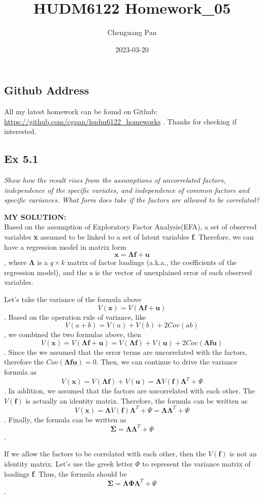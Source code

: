 \documentclass[
]{article}
\title{HUDM6122 Homework\_05}
\author{Chenguang Pan}
\date{2023-03-20}
\begin{document}
\maketitle

\hypertarget{github-address}{%
\subsection{Github Address}\label{github-address}}

All my latest homework can be found on Github:
\url{https://github.com/cgpan/hudm6122_homeworks} . Thanks for checking
if interested.

\hypertarget{ex-5.1}{%
\subsection{Ex 5.1}\label{ex-5.1}}

\emph{Show how the result rises from the assumptions of uncorrelated
factors, independence of the specific variates, and independence of
common factors and specific variances. What form does take if the
factors are allowed to be correlated?}

\textbf{MY SOLUTION:}\\
Based on the assumption of Exploratory Factor Analysis(EFA), a set of
observed variables \textbf{x} assumed to be linked to a set of latent
variables \textbf{f}. Therefore, we can have a regression model in
matrix form
\[\boldsymbol x=\boldsymbol\Lambda \boldsymbol f + \boldsymbol u\],
where \(\boldsymbol \Lambda\) is a \(q \times k\) matrix of factor
loadings (a.k.a., the coefficients of the regression model), and the
\emph{u} is the vector of unexplained error of each observed variables.

Let's take the variance of the formula above
\[V(\boldsymbol x) = V(\boldsymbol\Lambda \boldsymbol f + \boldsymbol u)\].
Based on the operation rule of variance, like
\[V(a+b)= V(a) + V(b) + 2Cov(ab)\], we combined the two formulas above,
then
\[V(\boldsymbol x) = V(\boldsymbol\Lambda \boldsymbol f + \boldsymbol u) = V(\boldsymbol\Lambda \boldsymbol f) + V(\boldsymbol u) + 2 Cov(\boldsymbol\Lambda \boldsymbol f \boldsymbol u)\].
Since the we assumed that the error terms are uncorrelated with the
factors, therefore the
\(Cov(\boldsymbol\Lambda \boldsymbol f \boldsymbol u)=0\). Then, we can
continue to drive the variance formula as
\[V(\boldsymbol x) = V(\boldsymbol\Lambda \boldsymbol f) + V(\boldsymbol u) = \boldsymbol\Lambda V(\boldsymbol f) \boldsymbol\Lambda^T + \Psi\].
In addition, we assumed that the factors are uncorrelated with each
other. The \(V(\boldsymbol f)\) is actually an identity matrix.
Therefore, the formula can be written as
\[V(\boldsymbol x) = \boldsymbol\Lambda V(\boldsymbol f) \boldsymbol\Lambda^T + \Psi = \boldsymbol\Lambda \boldsymbol\Lambda^T + \Psi\].
Finally, the formula can be written as
\[\boldsymbol \Sigma = \boldsymbol\Lambda \boldsymbol\Lambda^T + \Psi\].

If we allow the factors to be correlated with each other, then the
\(V(\boldsymbol f)\) is not an identity matrix. Let's use the greek
letter \(\Phi\) to represent the variance matrix of loadings \textbf{f}.
Thus, the formula should be
\[\boldsymbol \Sigma = \boldsymbol\Lambda \boldsymbol \Phi \boldsymbol\Lambda^T + \Psi\].
\end{document}
